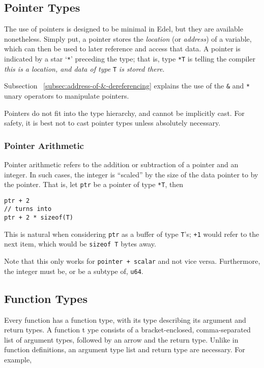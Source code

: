 \subsection{Pointer Types}\label{subsec:pointer-types}

The use of pointers is designed to be minimal in Edel, but they are available nonetheless.
Simply put, a pointer stores the \textit{location} (or \textit{address}) of a variable, which can then be used to later reference and access that data.
A pointer is indicated by a star `\texttt{*}' preceding the type;
that is, type \texttt{*T} is telling the compiler \textit{this is a location, and data of type } \texttt{T} \textit{is stored there}.

Subsection ~\ref{subsec:address-of-&-dereferencing} explains the use of the \texttt{\&} and \texttt{*} unary operators to manipulate pointers.

Pointers do not fit into the type hierarchy, and cannot be implicitly cast.
For safety, it is best not to cast pointer types unless absolutely necessary.

\subsubsection{Pointer Arithmetic}

Pointer arithmetic refers to the addition or subtraction of a pointer and an integer.
In such cases, the integer is ``scaled'' by the size of the data pointer to by the pointer.
That is, let \texttt{ptr} be a pointer of type \texttt{*T}, then

\begin{lstlisting}[language=CustomLang]
ptr + 2
// turns into
ptr + 2 * sizeof(T)
\end{lstlisting}

This is natural when considering \texttt{ptr} as a buffer of type \texttt{T}'s;
\texttt{+1} would refer to the next item, which would be \texttt{sizeof T} bytes away.

Note that this only works for \texttt{pointer + scalar} and not vice versa.
Furthermore, the integer must be, or be a subtype of, \texttt{u64}.

\subsection{Function Types}\label{subsec:function-types}

Every function has a function type, with its type describing its argument and return types.
A function t ype consists of a bracket-enclosed, comma-separated list of argument types, followed by an arrow and the return type.
Unlike in function definitions, an argument type list and return type are necessary.
For example,

